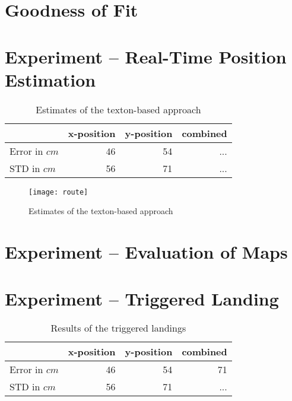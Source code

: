 \section{Goodness of Fit}


\section{Experiment -- Real-Time Position Estimation}
\label{sec:experiment-2}

\begin{table}[H]
  \centering
  \begin{tabular}{lrrr}
    \toprule
    & x-position & y-position & combined\\
    \midrule
    Error in $cm$ & 46 & 54 & ...\\
    STD in $cm$ & 56 & 71  & ...\\
    \bottomrule
  \end{tabular}
  \caption[Estimates of the texton-based approach]{Estimates of the texton-based approach}
  \label{tab:targetlanding}
\end{table}
\begin{figure}
\texttt{[image: route]}
  \caption[Estimates of the texton-based approach]{Estimates of the texton-based approach}
  \label{fig:route}
\end{figure}

\section{Experiment -- Evaluation of Maps}
\label{sec:experiment-3}

\section{Experiment -- Triggered Landing}
\label{sec:experiment-4}

\begin{table}[H]
  \centering
  \begin{tabular}{lrrr}
    \toprule
    & x-position & y-position & combined\\
    \midrule
    Error in $cm$ & 46 & 54 & 71\\
    STD in $cm$ & 56 & 71  & ...\\
    \bottomrule
  \end{tabular}
  \caption[Triggered landings]{Results of the triggered landings}
  \label{tab:targetlanding}

\end{table}

